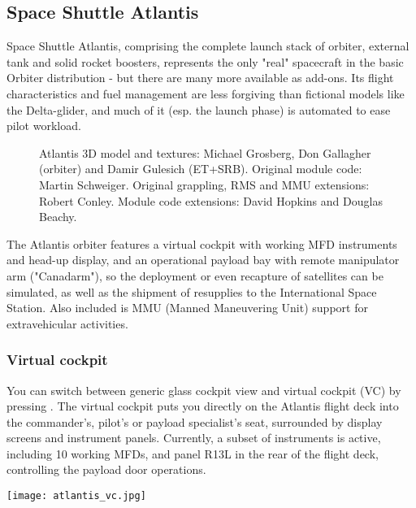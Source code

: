 \documentclass[Orbiter User Manual.tex]{subfiles}
\begin{document}
\subsection{Space Shuttle Atlantis}
\label{ssec:atlantis}
Space Shuttle Atlantis, comprising the complete launch stack of orbiter, external tank and solid rocket boosters, represents the only "real" spacecraft in the basic Orbiter distribution - but there are many more available as add-ons. Its flight characteristics and fuel management are less forgiving than fictional models like the Delta-glider, and much of it (esp. the launch phase) is automated to ease pilot workload.


\begin{figure}[H]
	\centering
	\caption{Atlantis 3D model and textures: Michael Grosberg, Don Gallagher (orbiter) and Damir Gulesich (ET+SRB). Original module code: Martin Schweiger. Original grappling, RMS and MMU extensions: Robert Conley. Module code extensions: David Hopkins and Douglas Beachy.}
\end{figure}

\noindent
The Atlantis orbiter features a virtual cockpit with working MFD instruments and head-up display, and an operational payload bay with remote manipulator arm ("Canadarm"), so the deployment or even recapture of satellites can be simulated, as well as the shipment of resupplies to the International Space Station. Also included is MMU (Manned Maneuvering Unit) support for extravehicular activities.


\subsubsection{Virtual cockpit}
You can switch between generic glass cockpit view and virtual cockpit (VC) by pressing . The virtual cockpit puts you directly on the Atlantis flight deck into the commander's, pilot's or payload specialist's seat, surrounded by display screens and instrument panels. Currently, a subset of instruments is active, including 10 working MFDs, and panel R13L in the rear of the flight deck, controlling the payload door operations.

\begin{center}
\texttt{[image: atlantis\_vc.jpg]}
\end{center}
\end{document}
